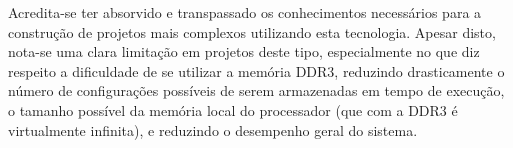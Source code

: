 \documentclass[11pt,a4paper,oneside]{book}
\begin{document}
Acredita-se ter absorvido e transpassado os conhecimentos necessários para a construção de projetos mais complexos utilizando esta tecnologia.
Apesar disto, nota-se uma clara limitação em projetos deste tipo, especialmente no que diz respeito a dificuldade de se utilizar a memória DDR3, reduzindo drasticamente o número de configurações possíveis de serem armazenadas em tempo de execução, o tamanho possível da memória local do processador (que com a DDR3 é virtualmente infinita), e reduzindo o desempenho geral do sistema.

\ifx\compilewholereport\undefined
	
	\newsavebox\mytempbib\savebox\mytempbib{\parbox{\textwidth}{}}

	\listoftodos
	
\end{document}
